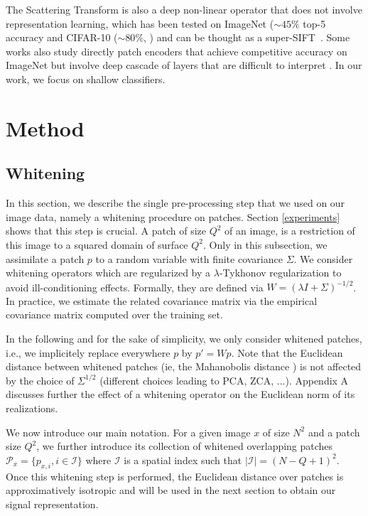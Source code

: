 \documentclass{article}
\begin{document}
{The Scattering Transform \citep{mallat2012group} is also a deep non-linear operator that does not involve representation learning, which has been tested on ImageNet ($\sim 45\%$ top-5 accuracy \citep{zarka2019deep} and  CIFAR-10 ($\sim 80 \%$, \citep{Oyallon_2015_CVPR}) and can be thought as a super-SIFT~\citep{Oyallon_2018_ECCV}.
Some works also study directly patch encoders that achieve competitive accuracy on ImageNet but involve deep cascade of layers that are difficult to interpret \citep{oyallon2017scaling,zarka2019deep,brendel2019approximating}. In our work, we focus on shallow classifiers.

\section{Method}
\label{method}

\subsection{Whitening}

In this section, we describe the single pre-processing step that we used on our image data, namely a whitening procedure on patches. Section \ref{experiments} shows that this step is crucial. A patch of size $Q^2$ of an image, is a  restriction of this image to a squared domain of surface $Q^2$. Only in this subsection, we assimilate a patch $p$ to a random variable with finite covariance $\Sigma$. We consider whitening operators which are regularized by a $\lambda$-Tykhonov regularization to avoid ill-conditioning effects. Formally, they are defined via $W=(\lambda I+\Sigma
)^{-1/2}$. In practice, we estimate the related covariance matrix via the empirical covariance matrix  computed over the training set.

In the following and for the sake of simplicity, we only  consider whitened patches, i.e., we implicitely replace everywhere $p$ by $p'=Wp$. Note that the Euclidean distance between whitened patches (ie, the Mahanobolis distance \citep{chandra1936generalised, mclachlan1999mahalanobis} ) is not affected by the choice of $\Sigma^{1/2}$ (different choices leading to PCA, ZCA, ...). Appendix A discusses further the effect of a whitening operator on the Euclidean norm of its realizations.
 
 
We now introduce our main notation. For a given image $x$ of size $N^2$ and a patch size $Q^2$, we further introduce its collection of whitened overlapping patches $\mathcal{P}_x=\{p_{x,i},i\in\mathcal{I}\}$ where $\mathcal{I}$ is a spatial index such that $|\mathcal{I}|=(N-Q+1)
^2$.
Once this whitening step is performed, the Euclidean distance over patches is approximatively isotropic and will be used in the next section to obtain our signal representation.

}
\end{document}
